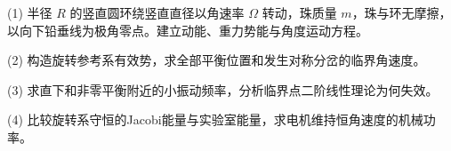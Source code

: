 (1) 半径 \(R\) 的竖直圆环绕竖直直径以角速率 \(\Omega\) 转动，珠质量 \(m\)，珠与环无摩擦，以向下铅垂线为极角零点。建立动能、重力势能与角度运动方程。

(2) 构造旋转参考系有效势，求全部平衡位置和发生对称分岔的临界角速度。

(3) 求直下和非零平衡附近的小振动频率，分析临界点二阶线性理论为何失效。

(4) 比较旋转系守恒的Jacobi能量与实验室能量，求电机维持恒角速度的机械功率。
